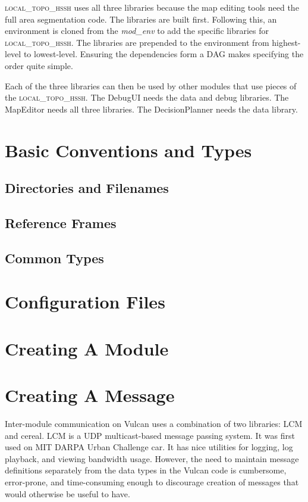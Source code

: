 \documentclass{article}
\begin{document}
\textsc{local\_topo\_hssh} uses all three libraries because the map editing tools need the full area segmentation code. 
The libraries are built first. Following this, an environment is cloned from the \emph{mod\_env} to add the specific 
libraries for \textsc{local\_topo\_hssh}. The libraries are prepended to the environment from highest-level to 
lowest-level. Ensuring the dependencies form a DAG makes specifying the order quite simple.

Each of the three libraries can then be used by other modules that use pieces of the \textsc{local\_topo\_hssh}. The 
DebugUI needs the data and debug libraries. The MapEditor needs all three libraries. The DecisionPlanner needs the data 
library.

\section{Basic Conventions and Types}
\subsection{Directories and Filenames}
\subsection{Reference Frames}
\subsection{Common Types}

\section{Configuration Files}

\section{Creating A Module}

\section{Creating A Message}

Inter-module communication on Vulcan uses a combination of two libraries: LCM and cereal. LCM is a UDP multicast-based 
message passing system. It was first used on MIT DARPA Urban Challenge car. It has nice utilities for logging, log 
playback, and viewing bandwidth usage. However, the need to maintain message definitions separately from the data types 
in the Vulcan code is cumbersome, error-prone, and time-consuming enough to discourage creation of messages that would 
otherwise be useful to have. 
\end{document}

